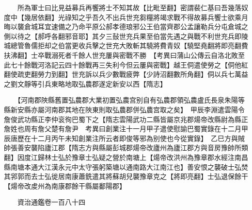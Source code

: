 　　所為軍士曰比見益募兵再饗將士不知其故【比毗至翻】密謂裴仁基曰吾幾落奴度中【幾居依翻】光祿知之乎吾久不出兵世充芻糧將竭求戰不得故募兵饗士欲乘月晦以襲倉城耳宜速備之乃命平原公郝孝德琅邪公王伯當齊郡公孟讓勒兵分屯倉城之側以待之【郝呼各翻邪音耶】其夕三鼔世充兵果至伯當先遇之與戰不利世充兵即陵城總管魯儒拒却之伯當更收兵擊之世充大敗斬其驍將費青奴【驍堅堯翻將即亮翻費扶沸翻】士卒戰溺死者千餘人世充屢與密戰不勝　【考異曰蒲山公傳云自洛北敗至此七十餘戰河洛記云四十餘戰再三失利今但云屢與密戰】越王侗遣使勞之【侗他紅翻使疏吏翻勞力到翻】世充訴以兵少數戰疲弊【少詩沼翻數所角翻】侗以兵七萬益之劉文靜等引兵東略地取弘農郡遂定新安以西【隋志】

　　【河南郡陜縣舊置弘農郡大業初置弘農宫别自有弘農郡領弘農盧氏長泉朱陽等縣新安縣亦屬河南郡其地在陜東則取弘農郡併弘農宫取之矣】　甲辰李淵遣雲陽令詹俊武功縣正李仲衮徇巴蜀下之【隋志雲陽武功二縣皆屬京兆郡煬帝改縣尉為縣正詹姓也周有詹父楚有詹尹　考異曰創業注十一月甲子遣使慰諭巴蜀實錄在十二月甲辰唐歷在十二月丙午未知創業注所云者即俊等邪為别使也今從實錄】　乙巳方與賊帥張善安襲陷廬江郡【隋志方與縣屬彭城郡煬帝改廬州為廬江郡方與音房豫帥所類翻】因度江歸林士弘於豫章士弘疑之營於南塘上【煬帝改洪州為豫章郡水經注南昌縣南塘本通大江漢永元中太守張躬築塘以通南路大江南江也】善安恨之襲破士弘焚其郛郭而去士弘徙居南康蕭銑遣其將蘇胡兒襲豫章克之【將即亮翻】士弘退保餘干【煬帝改䖍州為南康郡餘干縣屬鄱陽郡】

　　資治通鑑卷一百八十四  
    


 


 



 

 
  







 


　　
　　
　
　
　


　　

　















	
	









































